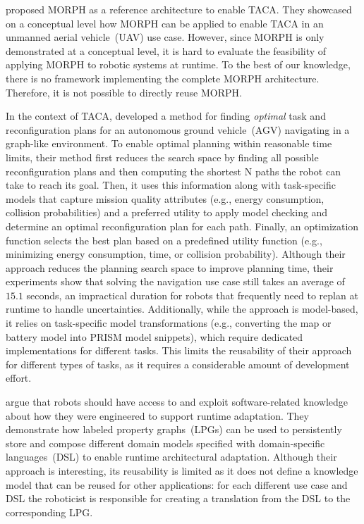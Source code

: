 \cite{braberman2018extended} proposed MORPH as a reference architecture to enable TACA\@. They showcased on a conceptual level how MORPH can be applied to enable TACA in an unmanned aerial vehicle~(UAV) use case. However, since MORPH is only demonstrated at a conceptual level, it is hard to evaluate the feasibility of applying MORPH to robotic systems at runtime. To the best of our knowledge, there is no framework implementing the complete MORPH architecture. Therefore, it is not possible to directly reuse MORPH\@. %

In the context of TACA, \cite{CAMARASoftwareArchitectureTask2020} developed a method for finding \emph{optimal} task and reconfiguration plans for an autonomous ground vehicle~(AGV) navigating in a graph-like environment. To enable optimal planning within reasonable time limits, their method first reduces the search space by finding all possible reconfiguration plans and then computing the shortest N paths the robot can take to reach its goal. Then, it uses this information along with task-specific models that capture mission quality attributes (e.g., energy consumption, collision probabilities) and a preferred utility to apply model checking and determine an optimal reconfiguration plan for each path. Finally, an optimization function selects the best plan based on a predefined utility function (e.g., minimizing energy consumption, time, or collision probability). Although their approach reduces the planning search space to improve planning time, their experiments show that solving the navigation use case still takes an average of $15.1$ seconds, an impractical duration for robots that frequently need to replan at runtime to handle uncertainties. Additionally, while the approach is model-based, it relies on task-specific model transformations (e.g., converting the map or battery model into PRISM model snippets), which require dedicated implementations for different tasks. This limits the reusability of their approach for different types of tasks, as it requires a considerable amount of development effort. %

\cite{graph_based_nico} argue that robots should have access to and exploit software-related knowledge about how they were engineered to support runtime adaptation. They demonstrate how labeled property graphs~(LPGs) can be used to persistently store and compose different domain models specified with domain-specific languages~(DSL) to enable runtime architectural adaptation. Although their approach is interesting, its reusability is limited as it does not define a knowledge model that can be reused for other applications: for each different use case and DSL the roboticist is responsible for creating a translation from the DSL to the corresponding LPG\@. %

